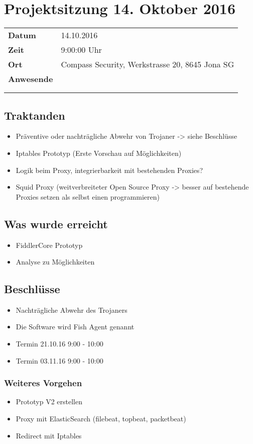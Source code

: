 \documentclass[class=scrbook,crop=false]{standalone}
\begin{document}
	\section{Projektsitzung 14. Oktober 2016}

	\begin{tabular}{ll}
		\textbf{Datum} & 14.10.2016 \\
		\textbf{Zeit} & 9:00\textendash10:00 Uhr \\
		\textbf{Ort} & Compass Security, Werkstrasse 20, 8645 Jona SG \\
		\textbf{Anwesende} & \ibuf \\ & \fbif \\ & \sadf
	\end{tabular}

	\subsection*{Traktanden}
	\begin{itemize}
		\item Präventive oder nachträgliche Abwehr von Trojaner -> siehe Beschlüsse
		\item Iptables Prototyp (Erste Vorschau auf Möglichkeiten)
		\item Logik beim Proxy, integrierbarkeit mit bestehenden Proxies?
		\item Squid Proxy (weitverbreiteter Open Source Proxy -> besser auf bestehende Proxies setzen als selbst einen programmieren)
	\end{itemize}

	\subsection*{Was wurde erreicht}
	\begin{itemize}
		\item FiddlerCore Prototyp
		\item Analyse zu Möglichkeiten
	\end{itemize}

	\subsection*{Beschlüsse}
	\begin{itemize}
		\item Nachträgliche Abwehr des Trojaners
		\item Die Software wird Fish Agent genannt
		\item Termin 21.10.16 9:00 - 10:00
		\item Termin 03.11.16 9:00 - 10:00
	\end{itemize}

	\subsubsection*{Weiteres Vorgehen}
	\begin{itemize}
		\item Prototyp V2 erstellen
		\item Proxy mit ElasticSearch (filebeat, topbeat, packetbeat)
		\item Redirect mit Iptables
	\end{itemize}
\end{document}
